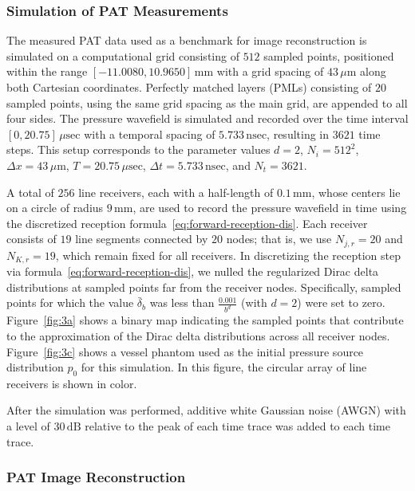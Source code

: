 \documentclass[11pt,reqno]{amsart}
\theoremstyle{remark}
\begin{document}
\subsubsection{Simulation of PAT Measurements}

The measured PAT data used as a benchmark for image reconstruction is simulated on a computational grid consisting of \(512\) sampled points, positioned within the range \([-11.0080, 10.9650] \, \mathrm{mm}\) with a grid spacing of \(43 \, \mu\mathrm{m}\) along both Cartesian coordinates. Perfectly matched layers (PMLs) consisting of \(20\) sampled points, using the same grid spacing as the main grid, are appended to all four sides. The pressure wavefield is simulated and recorded over the time interval \([0, 20.75]\, \mu\mathrm{sec}\) with a temporal spacing of \(5.733 \,  \mathrm{nsec}\), resulting in \(3621\) time steps. This setup corresponds to the parameter values \(d = 2\), \(N_i = 512^2\), \(\Delta x = 43\, \mu\mathrm{m}\), \(T = 20.75\, \mu\mathrm{sec}\), \(\Delta t = 5.733\, \mathrm{nsec}\), and \(N_t = 3621\). 

A total of \(256\) line receivers, each with a half-length of \(0.1\, \mathrm{mm}\), whose centers lie on a circle of radius \(9\, \mathrm{mm}\), are used to record the pressure wavefield in time using the discretized reception formula~\eqref{eq:forward-reception-dis}. Each receiver consists of \(19\) line segments connected by \(20\) nodes; that is, we use \(N_{j,r} = 20\) and \(N_{K,r} = 19\), which remain fixed for all receivers. In discretizing the reception step via formula~\ref{eq:forward-reception-dis}, we nulled the regularized Dirac delta distributions at sampled points far from the receiver nodes. Specifically, sampled points for which the value \(\bar{\delta}_b\) was less than \(\frac{0.001}{b^d}\) (with \(d = 2\)) were set to zero. Figure~\ref{fig:3a} shows a binary map indicating the sampled points that contribute to the approximation of the Dirac delta distributions across all receiver nodes. Figure~\ref{fig:3c} shows a vessel phantom used as the initial pressure source distribution \(p_0\) for this simulation. In this figure, the circular array of line receivers is shown in color.

After the simulation was performed, additive white Gaussian noise (AWGN) with a level of \(30\,\mathrm{dB}\) relative to the peak of each time trace was added to each time trace.


\subsubsection{PAT Image Reconstruction}
\end{document}
